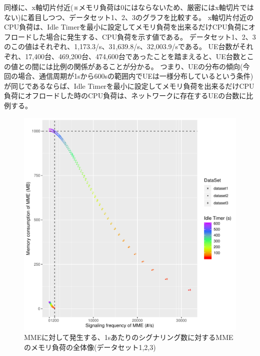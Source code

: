 \documentclass[a4j]{ujarticle}
\begin{document}
同様に、x軸切片付近(※メモリ負荷は0にはならないため、厳密にはx軸切片ではない)に着目しつつ、データセット1、2、3のグラフを比較する。
x軸切片付近のCPU負荷は、Idle Timerを最小に設定してメモリ負荷を出来るだけCPU負荷にオフロードした場合に発生する、CPU負荷を示す値である。
データセット1、2、3のこの値はそれぞれ、1,173.3/s、31,639.8/s、32,003.9/sである。
UE台数がそれぞれ、17,400台、469,200台、474,600台であったことを踏まえると、UE台数とこの値との間には比例の関係があることが分かる。
つまり、UEの分布の傾向(今回の場合、通信周期が1sから600sの範囲内でUEは一様分布しているという条件)が同じであるならば、Idle Timerを最小に設定してメモリ負荷を出来るだけCPU負荷にオフロードした時のCPU負荷は、ネットワークに存在するUEの台数に比例する。



\begin{figure}[htbp]
  \centering
  \includegraphics[width=0.9\hsize]{1_2_3_signaling_vs_memoryload_all_10s.pdf}
  \caption{MMEに対して発生する、1sあたりのシグナリング数に対するMMEのメモリ負荷の全体像(データセット1,2,3)}
  \label{1_2_3_signaling_vs_memoryload_all}
\end{figure}
\clearpage
\end{document}
